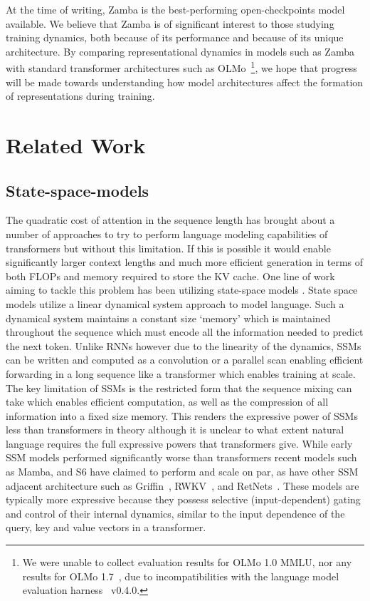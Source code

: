 At the time of writing, Zamba is the best-performing open-checkpoints model available. We believe that Zamba is of significant interest to those studying training dynamics, both because of its performance and because of its unique architecture. By comparing representational dynamics in models such as Zamba with standard transformer architectures such as OLMo~\citep{groeneveld2024olmo}\footnote[1]{We were unable to collect evaluation results for OLMo 1.0 MMLU, nor any results for OLMo 1.7~\citep{olmo-1.7}, due to incompatibilities with the language model evaluation harness~\citep{eval-harness} v0.4.0.}, we hope that progress will be made towards understanding how model architectures affect the formation of representations during training.

\section{Related Work}

\subsection{State-space-models}
The quadratic cost of attention in the sequence length has brought about a number of approaches to try to perform language modeling capabilities of transformers but without this limitation. If this is possible it would enable significantly larger context lengths and much more efficient generation in terms of both FLOPs and memory required to store the KV cache. One line of work aiming to tackle this problem has been utilizing state-space models \citep{gu2021efficiently,gu2020hippo,gu2021combining}. State space models utilize a linear dynamical system approach to model language. Such a dynamical system maintains a constant size `memory' which is maintained throughout the sequence which must encode all the information needed to predict the next token. Unlike RNNs however due to the linearity of the dynamics, SSMs can be written and computed as a convolution or a parallel scan enabling efficient forwarding in a long sequence like a transformer which enables training at scale. The key limitation of SSMs is the restricted form that the sequence mixing can take which enables efficient computation, as well as the compression of all information into a fixed size memory. This renders the expressive power of SSMs less than transformers in theory although it is unclear to what extent natural language requires the full expressive powers that transformers give. While early SSM models performed significantly worse than transformers recent models such as Mamba, and S6 have claimed to perform and scale on par, as have other SSM adjacent architecture such as Griffin~\citep{de2024griffin}, RWKV~\citep{peng2023rwkv,peng2024eagle}, and RetNets~\citep{sun2023retentive}. These models are typically more expressive because they possess selective (input-dependent) gating and control of their internal dynamics, similar to the input dependence of the query, key and value vectors in a transformer. 

